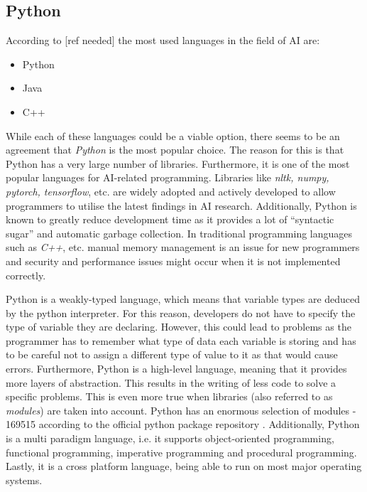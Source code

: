 \documentclass[12pt,a4paper]{article}
\begin{document}
\subsection{Python}
According to [ref needed] the most used languages in the field of AI are:
\begin{itemize}
    \item Python
    \item Java
    \item C++
\end{itemize}

While each of these languages could be a viable option, there seems to be an agreement that \textit{Python} is the most popular choice.  The reason for this is that Python has a very large number of libraries. Furthermore, it is one of the most popular languages for AI-related programming. Libraries like \textit{nltk, numpy, pytorch, tensorflow}, etc. are widely adopted and actively developed to allow programmers to utilise the latest findings in AI research. Additionally, Python is known to greatly reduce development time as it provides a lot of \enquote{syntactic sugar} and automatic garbage collection. In traditional programming languages such as \textit{C++}, etc. manual memory management is an issue for new programmers and security and performance issues might occur when it is not implemented correctly. 

Python is a weakly-typed language, which means that variable types are deduced by the python interpreter. For this reason, developers do not have to specify the type of variable they are declaring. However, this could lead to problems as the programmer has to remember what type of data each variable is storing and has to be careful not to assign a different type of value to it as that would cause errors. Furthermore, Python is a high-level language, meaning that it provides more layers of abstraction. This results in the writing of less code to solve a specific problems. This is even more true when libraries (also referred to as \textit{modules}) are taken into account. Python has an enormous selection of modules - 169515 according to the official python package repository \cite{PyPI:online}. Additionally, Python is a multi paradigm language, i.e. it supports object-oriented programming, functional programming, imperative programming and procedural programming. Lastly, it is a cross platform language, being able to run on most major operating systems.
\end{document}
